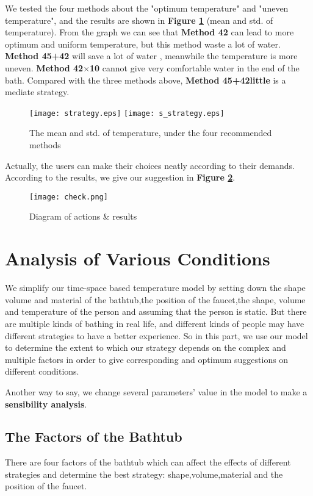 \documentclass{HZNUMCM}
\begin{document}
We tested the four methods about the "optimum temperature" and "uneven temperature", and the results
are shown in \textbf{Figure \ref{strategy}} (mean and std. of temperature). From the graph we can
see that \textbf{Method 42} can lead to more optimum and uniform temperature, but this method waste
a lot of water. \textbf{Method 45+42} will save a lot of water , meanwhile the temperature is more
uneven. \textbf{Method 42$\times$10} cannot give very comfortable water in the end of the bath.
Compared with the three methods above, \textbf{Method 45+42little} is a mediate strategy.
\begin{figure}[!htbp]
\small
\centering
\texttt{[image: strategy.eps]}
\texttt{[image: s\_strategy.eps]}
\caption{The mean and std. of temperature, under the four recommended methods}\label{strategy}
\end{figure}

Actually, the users can make their choices neatly according to their demands. According to the
results, we give our suggestion in \textbf{Figure \ref{check}}.
\begin{figure}[!htbp]
\small
\centering
\texttt{[image: check.png]}
\caption{Diagram of actions \& results}\label{check}
\end{figure}


\section{Analysis of Various Conditions}\label{condition}
We simplify our time-space based temperature model by setting down the shape volume and material of
the bathtub,the position of the faucet,the shape, volume and temperature of the person and assuming
that the person is static. But there are multiple kinds of bathing in real life, and different kinds
of people may have different strategies to have a better experience. So in this part, we use our
model to determine the extent to which our strategy depends on the complex and multiple factors in
order to give corresponding and optimum suggestions on different conditions.

Another way to say, we change several parameters' value in the model to make a \textbf{sensibility
analysis}.

\subsection{The Factors of the Bathtub}
There are four factors of the bathtub which can affect the effects of different strategies and
determine the best strategy: shape,volume,material and the position of the faucet.
\end{document}
